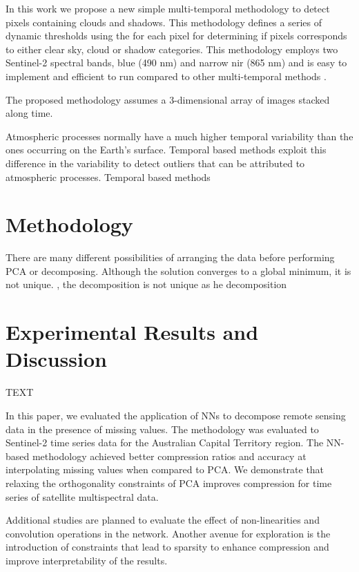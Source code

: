 \documentclass[essd, manuscript]{copernicus}
\begin{document}
In this work we propose a new simple multi-temporal methodology to detect pixels containing clouds and shadows. This methodology defines a series of dynamic thresholds using the for each pixel for determining if pixels corresponds to either clear sky, cloud or shadow categories. This methodology employs two Sentinel-2 spectral bands, blue (490 nm) and narrow nir (865 nm) and is easy to implement and efficient to run compared to other multi-temporal methods \citep{frantz2015enhancing,zhu2018automatic}.

The proposed methodology assumes a 3-dimensional array of images stacked along time. 

Atmospheric processes normally have a much higher temporal variability than the ones occurring on the Earth's surface. Temporal based methods exploit this difference in the variability to detect outliers that can be attributed to atmospheric processes. Temporal based methods  


\section{Methodology}


There are many different possibilities of arranging the data before performing PCA or decomposing. 
Although the solution converges to a global minimum, it is not unique. , the decomposition is not unique as he decomposition 



\section{Experimental Results and Discussion}
TEXT


\conclusions  %
In this paper, we evaluated the application of NNs to decompose remote sensing data in the presence of missing values. The methodology was evaluated to Sentinel-2 time series data for the Australian Capital Territory region. The NN-based methodology achieved better compression ratios and accuracy at interpolating missing values when compared to PCA. We demonstrate that relaxing the orthogonality constraints of PCA improves compression for time series of satellite multispectral data.

Additional studies are planned to evaluate the effect of non-linearities and convolution operations in the network. Another avenue for exploration is the introduction of constraints that lead to sparsity to enhance compression and improve interpretability of the results. 
\end{document}
